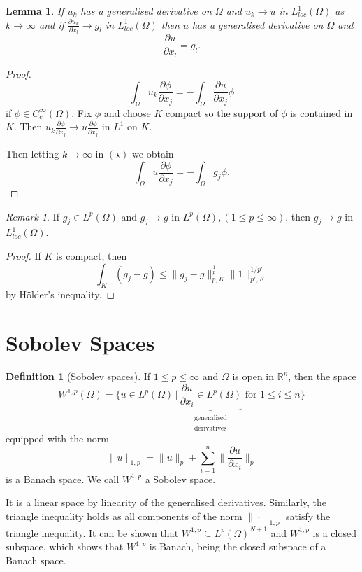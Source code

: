 \documentclass[10pt, oneside, reqno]{amsart}
\theoremstyle{plain}%
\newtheorem{lem}[thm]{Lemma}
\numberwithin{equation}{section}
\theoremstyle{definition}
\newtheorem{defn}[thm]{Definition}
\theoremstyle{remark}
\newtheorem*{rem}{Remark}
\newcommand{\given}{ \, | \,}
\newcommand{\R}{\mathbb{R}}
\begin{document}
\begin{lem}
    \label{lem:convergence_of_gen_deriv}
    If $u_k$ has a generalised derivative on $\Omega$ and $u_k \rightarrow u$ in $L^1_{loc}(\Omega)$ as $k \rightarrow \infty$ and if $\frac{\partial u_k}{\partial x_l} \rightarrow g_l$ in $L^1_{loc}(\Omega)$ then $u$ has a generalised derivative on $\Omega$ and \[
        \frac{\partial u}{\partial x_l} = g_l.
    \]
\end{lem}

\begin{proof}
    \[
        \int_\Omega u_k \frac{\partial \phi}{\partial x_j} = -\int_\Omega \frac{\partial u}{\partial x_j} \phi
        \tag{$\star$}
    \] if $\phi \in C_c^\infty(\Omega)$.  Fix $\phi$ and choose $K$ compact so the support of $\phi$ is contained in $K$.  Then $u_k {\frac{\partial \phi}{\partial x_j}} \rightarrow u \frac{\partial \phi}{\partial x_j}$ in $L^1$ on $K$.  
    
    Then letting $k \rightarrow \infty$ in $(\star)$ we obtain \[
        \int_\Omega u \frac{\partial \phi}{\partial x_j} = - \int_\Omega g_j \phi.
    \]
\end{proof}

\begin{rem}
    If $g_j \in L^p(\Omega)$ and $g_j \rightarrow g$ in $L^p(\Omega), (1 \leq p \leq \infty)$, then $g_j \rightarrow g$ in $L^1_{loc}(\Omega)$.  
\end{rem}

\begin{proof}
    If $K$ is compact, then \[
        \int_K (g_j - g) \leq \| g_j - g\|_{p, K}^\frac{1}{p} \| 1 \|^{1/p'}_{p', K}
    \] by H\"older's inequality.
\end{proof}

\section{Sobolev Spaces} %
\label{sec:sobolev_spaces}

\begin{defn}[Sobolev spaces]
    If $1 \leq p \leq \infty$ and $\Omega$ is open in $\R^n$, then the space \[
        W^{1, p}(\Omega) = \{ u \in L^p(\Omega) \given \underbrace{\frac{\partial u}{\partial x_i} \in L^p(\Omega)}_{\substack{\text{generalised} \\ \text{derivatives}}} \text{ for } 1 \leq i \leq n \}
    \] 
    equipped with the norm \[
        \| u \|_{1, p} = \| u \|_p + \sum_{i=1}^n \| \frac{\partial u}{\partial x_i} \|_p
    \] is a Banach space.  We call $W^{1, p}$ a Sobolev space.

    It is a linear space by linearity of the generalised derivatives.  Similarly, the triangle inequality holds as all components of the norm $\| \cdot \|_{1, p}$ satisfy the triangle inequality.  It can be shown that $W^{1, p} \subseteq L^p(\Omega)^{N+1}$ and $W^{1, p}$ is a closed subspace, which shows that $W^{1, p}$ is Banach, being the closed subspace of a Banach space.
\end{defn}
\end{document}
